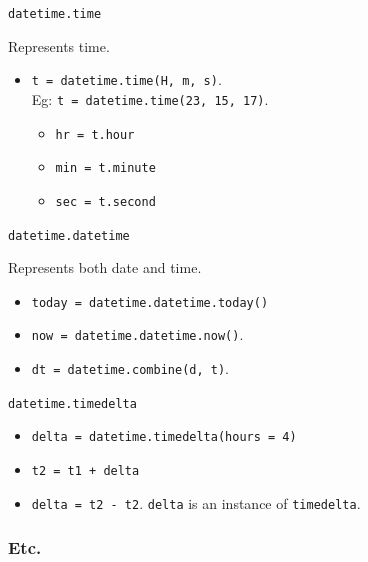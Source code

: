 \begin{center}
    \large{\texttt{datetime.time}}
\end{center}
Represents time.

\begin{itemize}
\item \texttt{t = datetime.time(H, m, s)}.\\
    Eg: \texttt{t = datetime.time(23, 15, 17)}.\\
    \begin{itemize}
    \item \texttt{hr = t.hour}\\
    \item \texttt{min = t.minute}\\
    \item \texttt{sec = t.second}\\
    \end{itemize}
\end{itemize}

\begin{center}
    \large{\texttt{datetime.datetime}}
\end{center}

Represents both date and time.

\begin{itemize}
    \item \texttt{today = datetime.datetime.today()}
    \item \texttt{now = datetime.datetime.now()}.
    \item \texttt{dt = datetime.combine(d, t)}.
\end{itemize}


\begin{center}
    \large{\texttt{datetime.timedelta}}
\end{center}

\begin{itemize}
\item \texttt{delta = datetime.timedelta(hours = 4)}
\item \texttt{t2 = t1 + delta}
\item \texttt{delta = t2 - t2}. \texttt{delta} is an instance of \texttt{timedelta}.\\
\end{itemize}

\subsubsection{Etc.}

